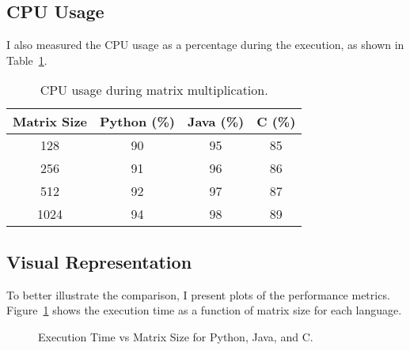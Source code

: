 \documentclass{article}
\begin{document}
\subsection{CPU Usage}

I also measured the CPU usage as a percentage during the execution, as shown in Table~\ref{tab:cpu_usage}.

\begin{table}[h!]
    \centering
    \begin{tabular}{|c|c|c|c|}
    \hline
    Matrix Size & Python (\%) & Java (\%) & C (\%) \\
    \hline
    128  & 90  & 95  & 85 \\
    256  & 91  & 96  & 86 \\
    512  & 92  & 97  & 87 \\
    1024 & 94  & 98  & 89 \\
    \hline
    \end{tabular}
    \caption{CPU usage during matrix multiplication.}
    \label{tab:cpu_usage}
\end{table}

\subsection{Visual Representation}

To better illustrate the comparison, I present plots of the performance metrics. Figure~\ref{fig:execution_time_plot} shows the execution time as a function of matrix size for each language.

\begin{figure}[h!]
    \centering
    \caption{Execution Time vs Matrix Size for Python, Java, and C.}
    \label{fig:execution_time_plot}
\end{figure}
\end{document}
